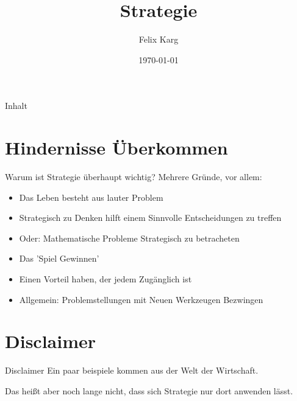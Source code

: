 \documentclass[12pt,compress,ngerman,utf8,t]{beamer}
\date{\today}
\institute{University of Freiburg}
\title{Strategie}
\author{Felix Karg}
\begin{document}
\maketitle


\begin{frame}{Inhalt}
    \small
    \begin{multicols}{2}
        \small
        \tableofcontents[hidesubsections]
    \end{multicols}
    \clearpage
\end{frame}



\section{Hindernisse Überkommen}

\begin{frame}[c]{Warum ist Strategie überhaupt wichtig?}
    Mehrere Gründe, vor allem: \\
    \pause
    \begin{itemize}
        \item Das Leben besteht aus lauter Problem
            \pause
        \item Strategisch zu Denken hilft einem Sinnvolle Entscheidungen zu treffen
            \pause
        \item Oder: Mathematische Probleme Strategisch zu betracheten
            \pause
        \item Das 'Spiel Gewinnen'
            \pause
        \item Einen Vorteil haben, der jedem Zugänglich ist
            \pause
        \item Allgemein: Problemstellungen mit Neuen Werkzeugen Bezwingen
    \end{itemize}
\end{frame}


\section{Disclaimer}
\begin{frame}[c]{Disclaimer}
    Ein paar beispiele kommen aus der Welt der Wirtschaft. \\ \pause

    \vfill

    Das heißt aber noch lange nicht, dass sich Strategie nur dort anwenden lässt.
\end{frame}
\end{document}
